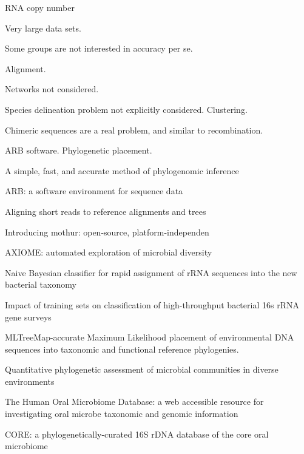 \documentclass{amsart}
\begin{document}
RNA copy number
\cite{morganEaInVitroSimulatedMetagenome10}


Very large data sets.

Some groups are not interested in accuracy per se.

Alignment.

Networks not considered.

Species delineation problem not explicitly considered. Clustering.

Chimeric sequences are a real problem, and similar to recombination.

ARB software.
Phylogenetic placement.

\cite{wu2008simple}
A simple, fast, and accurate method of phylogenomic inference

\cite{matsen2010pplacer}

\cite{ludwig2004arb}
{{ARB}: a software environment for sequence data}
\cite{berger2011performance}

\cite{berger2011aligning}
Aligning short reads to reference alignments and trees

\cite{caporaso2010qiime}

\cite{schloss2009introducing}
Introducing mothur: open-source, platform-independen

\cite{lynch2013axiome}
AXIOME: automated exploration of microbial diversity


\cite{wang2007naive}
{Naive Bayesian classifier for rapid assignment of rRNA sequences into the new bacterial taxonomy}

\cite{werner2011impact}
Impact of training sets on classification of high-throughput bacterial 16s rRNA gene surveys


\cite{stark2010mltreemap}
{{MLTreeMap}-accurate Maximum Likelihood placement of environmental DNA sequences into taxonomic and functional reference phylogenies.}

\cite{vonMeringEaQuantitative08}
{Quantitative phylogenetic assessment of microbial communities in diverse environments}

\cite{case2007rpob}

\cite{chen2010human}
The Human Oral Microbiome Database: a web accessible resource for investigating oral microbe taxonomic and genomic information

\cite{griffen2011core}
CORE: a phylogenetically-curated 16S rDNA database of the core oral microbiome

\cite{srinivasan2012bacterial}
\end{document}
